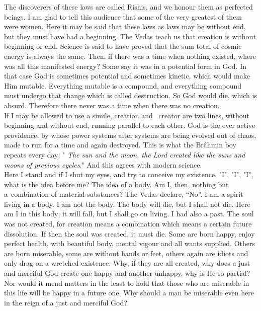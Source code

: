 The discoverers of these laws are called Rishis, and we honour
them as perfected beings. I am glad to tell this audience that some of
the very greatest of them were women. Here it may be said that these
laws as laws may be without end, but they must have had a beginning.
The Vedas teach us that creation is without beginning or end. Science
is said to have proved that the sum total of cosmic energy is always
the same. Then, if there was a time when nothing existed, where was all
this manifested energy? Some say it was in a potential form in God. In
that case God is sometimes potential and sometimes kinetic, which would
make Him mutable. Everything mutable is a compound, and everything
compound must undergo that change which is called destruction. So God
would die, which is absurd. Therefore there never was a time when there
was no creation.\\

If I may be allowed to use a simile, creation and 
creator are two lines, without beginning and without end, running
parallel to each other. God is the ever active providence, by whose
power systems after systems are being evolved out of chaos, made to run
for a time and again destroyed. This is what the Brâhmin boy repeats
every day: " \textit{The sun and the moon, the Lord created like the
suns and moons of previous cycles}." And this agrees with
modern science.\\

Here I stand and if I shut my eyes, and try to conceive my
existence, "I", "I", "I", what is the idea before me? The idea of a
body. Am I, then, nothing but a combination of material
substances? The Vedas declare,
“No”. I am a spirit living in a
body. I am not the body. The body will die,
but I shall not die. Here am I in this body; it will fall, but I shall
go on living.
I had also a past. The soul was not created, for creation means a
combination which
means a certain future dissolution. If then the soul was created, it
must die. Some
are born happy, enjoy perfect health, with beautiful body, mental
vigour and all wants
supplied. Others are born miserable, some are without hands or feet,
others again are
idiots and only drag on a wretched existence. Why, if they are all
created, why does a
just and merciful God create one happy and another unhappy, why is He
so partial? Nor
would it mend matters in the least to hold that those who are miserable
in this life
will be happy in a future one. Why should a man be miserable even here
in the reign of
a just and merciful God?\\

